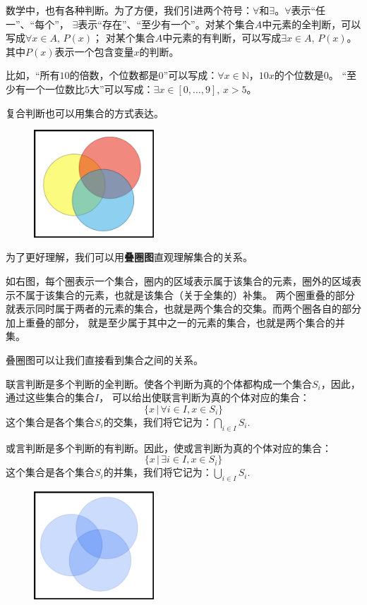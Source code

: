 \documentclass[12pt,UTF8]{ctexbook}
\begin{document}
数学中，也有各种判断。为了方便，我们引进两个符号：$\forall$和$\exists$。$\forall$表示“任一”、“每个”，
$\exists$表示“存在”、“至少有一个”。对某个集合$A$中元素的全判断，可以写成$\forall x \in A, \, P(x)$；
对某个集合$A$中元素的有判断，可以写成$\exists x \in A, \, P(x)$。其中$P(x)$表示一个包含变量$x$的判断。

比如，“所有$10$的倍数，个位数都是$0$”可以写成：$\forall x \in \mathbb{N}$，$ 10 x$的个位数是$0$。
“至少有一个一位数比$5$大”可以写成：$\exists x \in [0,\ldots ,9], \, x > 5$。

复合判断也可以用集合的方式表达。

\begin{figure} %
    \flushright
    \includegraphics[width=0.4\textwidth]{叠圈图0.png}
\end{figure}

为了更好理解，我们可以用\textbf{叠圈图}直观理解集合的关系。

如右图，每个圈表示一个集合，圈内的区域表示属于该集合的元素，圈外的区域表示不属于该集合的元素，也就是该集合（关于全集的）补集。
两个圈重叠的部分就表示同时属于两者的元素的集合，也就是两个集合的交集。而两个圈各自的部分加上重叠的部分，
就是至少属于其中之一的元素的集合，也就是两个集合的并集。

叠圈图可以让我们直接看到集合之间的关系。

联言判断是多个判断的全判断。使各个判断为真的个体都构成一个集合$S_i$，因此，通过这些集合的集合$I$，
可以给出使联言判断为真的个体对应的集合：
$$ \{x \,| \,\forall i \in I, x \in S_i \} $$
这个集合是各个集合$S_i$的交集，我们将它记为：$ \bigcap_{i\in I} S_i. $

或言判断是多个判断的有判断。因此，使或言判断为真的个体对应的集合：
$$ \{x \,|\, \exists i \in I, x \in S_i \} $$
这个集合是各个集合$S_i$的并集，我们将它记为：$ \bigcup_{i\in I} S_i. $

\begin{figure} %
    \flushright
    \includegraphics[width=0.4\textwidth]{叠圈图1.png}
\end{figure}
\end{document}
